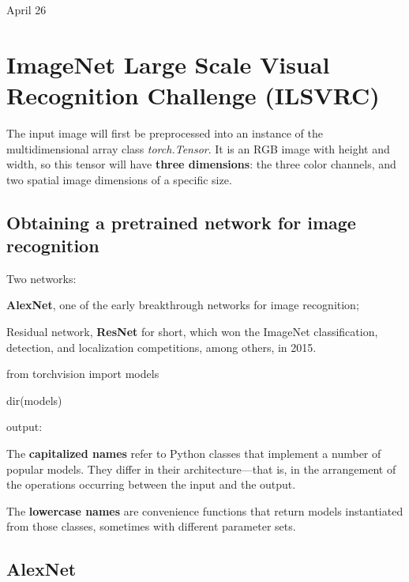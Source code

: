 \univlogo

{\Huge April 26}\vspace{5mm}

\section*{ImageNet Large Scale Visual Recognition Challenge (ILSVRC)}

The input image will first be preprocessed into an instance of the multidimensional array class \textsl{torch.Tensor}. It is an RGB image with height and width, so this tensor will have \textbf{three dimensions}: the three color channels, and two spatial image dimensions of a specific size. 

\subsection*{Obtaining a pretrained network for image recognition}

Two networks:

\textbf{AlexNet}, one of
the early breakthrough networks for image recognition;

Residual network, \textbf{ResNet} for short, which won the ImageNet classification, detection, and localization competitions, among others, in 2015.

\begin{python}
from torchvision import models

dir(models)
\end{python}

output:

\begin{python}
\end{python}

The \textbf{capitalized names} refer to Python classes that implement a number of popular models. They differ in their architecture—that is, in the arrangement of the operations occurring between the input and the output.

The \textbf{lowercase names} are convenience functions that return models instantiated from those classes, sometimes with different parameter sets.

\subsection*{AlexNet}

